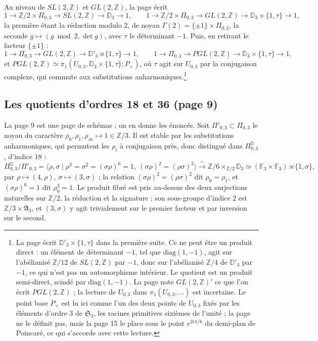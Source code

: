 \documentclass[11pt,a4paper]{article}
\begin{document}
Au niveau de $SL(2, \mathbb{Z})$ et $GL(2, \mathbb{Z})$, la page écrit
\[
1 \to \mathbb{Z}/2 \times \Pi_{0,3} \to SL(2, \mathbb{Z}) \to \mathbb{D}_3 \to 1,
\qquad
1 \to \mathbb{Z}/2 \times \Pi_{0,3} \to GL(2, \mathbb{Z}) \to \mathbb{D}_3 \times
\{1, \tau\} \to 1 ,
\]
la première étant la réduction modulo $2$, de noyau $\Gamma(2) = \{\pm 1\} \times
\Pi_{0,3}$, la seconde $g \mapsto (g \bmod 2, \det g)$, avec $\tau$ le
déterminant $-1$. Puis, en retirant le facteur $\{\pm 1\}$ :
\[
1 \to \Pi_{0,3} \to GL(2, \mathbb{Z}) \to \mathbb{D}'_3 \rtimes \{1, \tau\} \to 1,
\qquad
1 \to \Pi_{0,3} \to PGL(2, \mathbb{Z}) \to \mathbb{D}_3 \times \{1, \tau\} \to 1 ,
\]
et $PGL(2, \mathbb{Z}) \simeq \pi_1(U_{0,3}, \mathbb{D}_3 \times \{1, \tau\}; P_+)$,
où $\tau$ agit sur $U_{0,3}$ par la conjugaison complexe, qui commute aux
substitutions anharmoniques.\footnote{La page écrit
$\mathbb{D}'_3 \times \{1, \tau\}$ dans la première suite. Ce ne peut être un
produit direct : un élément de déterminant $-1$, tel que
$\mathrm{diag}(1, -1)$, agit sur l'abélianisé $\mathbb{Z}/12$ de
$SL(2, \mathbb{Z})$ par $-1$, donc sur l'abélianisé $\mathbb{Z}/4$ de
$\mathbb{D}'_3$ par $-1$, ce qui n'est pas un automorphisme intérieur. Le quotient
est un produit semi-direct, scindé par $\mathrm{diag}(1, -1)$. La page note
$GL(2, \mathbb{Z})'$ ce que l'on écrit $PGL(2, \mathbb{Z})$ ; la lecture de
$U_{0,3}$ dans $\pi_1(U_{0,3}, \ldots)$ est incertaine. Le point base $P_+$ est
lu ici comme l'un des deux points de $U_{0,3}$ fixés par les éléments d'ordre
$3$ de $\mathfrak{S}_3$, les racines primitives sixièmes de l'unité ; la page ne
le définit pas, mais la page 15 le place sous le point $e^{2i\pi/6}$ du
demi-plan de Poincaré, ce qui s'accorde avec cette lecture.}

\subsection*{Les quotients d'ordres 18 et 36 (page 9)}

La page 9 est une page de schémas ; on en donne les énoncés. Soit
$\Pi'_{0,3} \subset \Pi_{0,3}$ le noyau du caractère $\rho_0, \rho_1, \rho_\infty
\mapsto 1 \in \mathbb{Z}/3$. Il est stable par les substitutions anharmoniques,
qui permutent les $\rho_i$ à conjugaison près, donc distingué dans
$\Pi^{\mathbb{D}}_{0,3}$, d'indice $18$ :
\[
\Pi^{\mathbb{D}}_{0,3}/\Pi'_{0,3} = \langle \rho, \sigma \mid
\rho^3 = \sigma^2 = (\sigma\rho)^6 = 1,\ (\sigma\rho)^2 = (\rho\sigma)^2 \rangle
\xrightarrow{\ \sim\ }
\mathbb{Z}/6 \times_{\mathbb{Z}/2} \mathbb{D}_3
\simeq (\mathbb{F}_3 \times \mathbb{F}_3) \rtimes \{1, \sigma\} ,
\]
par $\rho \mapsto (4, \rho)$, $\sigma \mapsto (3, \sigma)$ ; la relation
$(\sigma\rho)^2 = (\rho\sigma)^2$ dit $\rho_0 = \rho_1$, et $(\sigma\rho)^6 = 1$
dit $\rho_0^3 = 1$. Le produit fibré est pris au-dessus des deux surjections
naturelles sur $\mathbb{Z}/2$, la réduction et la signature ; son sous-groupe
d'indice $2$ est $\mathbb{Z}/3 \times \mathfrak{A}_3$, et $(3, \sigma)$ y agit
trivialement sur le premier facteur et par inversion sur le second.
\end{document}
